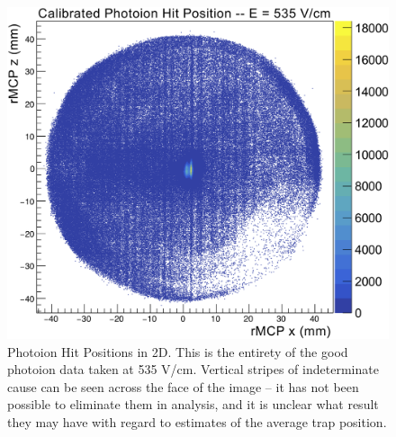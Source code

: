 \begin{figure}[h!tb]
	\centering
	\includegraphics[width=.999\linewidth]
	{Figures/rMCP_PI_2D_535.png}
	\caption[Photoion Hit Positions in 2D]{Photoion Hit Positions in 2D.  This is the entirety of the good photoion data taken at 535 V/cm.  Vertical stripes of indeterminate cause can be seen across the face of the image -- it has not been possible to eliminate them in analysis, and it is unclear what result they may have with regard to estimates of the average trap position.}	
	\label{fig:photoionhits_2D}
\end{figure}



